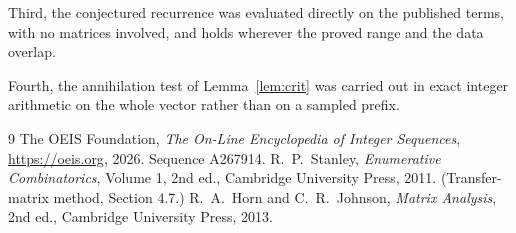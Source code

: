 \documentclass[11pt,a4paper]{article}
\theoremstyle{plain}
\theoremstyle{definition}
\begin{document}
Third, the conjectured recurrence was evaluated directly on the published terms, with no
matrices involved, and holds wherever the proved range and the data overlap.

Fourth, the annihilation test of Lemma~\ref{lem:crit} was carried out in exact integer
arithmetic on the whole vector rather than on a sampled prefix.

\begin{thebibliography}{9}
 The OEIS Foundation, \emph{The On-Line Encyclopedia of Integer
Sequences}, \url{https://oeis.org}, 2026. Sequence A267914.
 R.~P.~Stanley, \emph{Enumerative Combinatorics}, Volume 1, 2nd ed.,
Cambridge University Press, 2011. (Transfer-matrix method, Section 4.7.)
 R.~A.~Horn and C.~R.~Johnson, \emph{Matrix Analysis}, 2nd ed., Cambridge
University Press, 2013.
\end{thebibliography}
\end{document}
